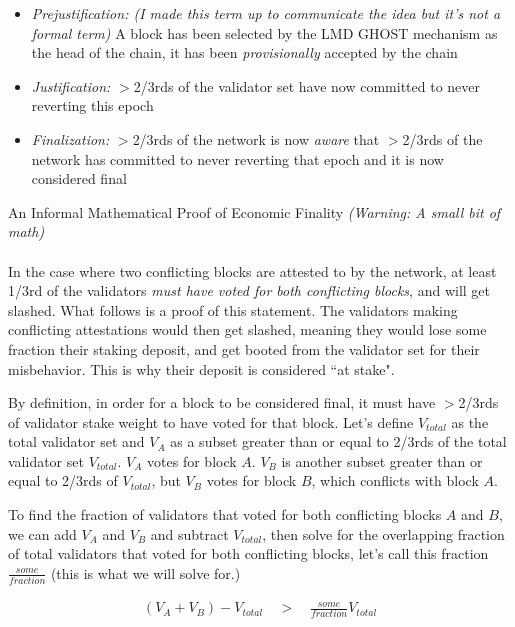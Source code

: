 \documentclass[12pt]{article}
\newenvironment{aside}
  {\begin{mdframed}[style=0,%
      backgroundcolor=fgcolor!5!\thepagecolor,  %
      fontcolor=fgcolor,     %
      leftline=false,rightline=false,leftmargin=2em,rightmargin=2em,%
      innerleftmargin=0pt,innerrightmargin=0pt,linewidth=0.75pt,%
      skipabove=7pt,skipbelow=7pt]\footnotesize}
  {\end{mdframed}}
\begin{document}
\begin{itemize}
    \item \textit{Prejustification: \small(I made this term up to communicate the idea but it's not a formal term)} \normalsize A block has been selected by the LMD GHOST mechanism as the head of the chain, it has been \textit{provisionally} accepted by the chain
    \item \textit{Justification:} $>$2/3rds of the validator set have now committed to never reverting this epoch
    \item \textit{Finalization:} $>$2/3rds of the network is now \textit{aware} that $>$2/3rds of the network has committed to never reverting that epoch and it is now considered final
\end{itemize}
\clearpage
\begin{aside}
    An Informal Mathematical Proof of Economic Finality \textit{(Warning: A small bit of math)}\\
    \\
    In the case where two conflicting blocks are attested to by the network, at least 1/3rd of the validators \textit{must have voted for both conflicting blocks}, and will get slashed. What follows is a proof of this statement. The validators making conflicting attestations would then get slashed, meaning they would lose some fraction their staking deposit, and get booted from the validator set for their misbehavior. This is why their deposit is considered ``at stake". 

    By definition, in order for a block to be considered final, it must have $>$2/3rds of validator stake weight to have voted for that block. Let's define $V_{total}$ as the total validator set and $V_A$ as a subset greater than or equal to 2/3rds of the total validator set $V_{total}$. $V_A$ votes for block $A$. $V_B$ is another subset greater than or equal to 2/3rds of $V_{total}$, but $V_B$ votes for block $B$, which conflicts with block $A$. 

    To find the fraction of validators that voted for both conflicting blocks $A$ and $B$, we can add $V_A$ and $V_B$ and subtract $V_{total}$, then solve for the overlapping fraction of total validators that voted for both conflicting blocks, let's call this fraction $\frac{some}{fraction}$ (this is what we will solve for.) 

\begin{align}
    (V_A+V_B)- V_{total} \quad > \quad \frac{some}{fraction}V_{total}
\end{align}


\end{aside}
\end{document}
